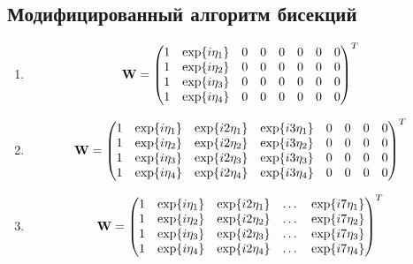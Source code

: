 \subsection{Модифицированный алгоритм бисекций}
\label{sec:Compressive:multipath}
\begin{enumerate}[label=\textbf{Шаг \arabic*:}]
    \item 
    \begin{equation}
        \vec W = 
        \begin{pmatrix}
            \mqty{
                1 & \exp{i\eta_1}\\
                1 & \exp{i\eta_2}\\
                1 & \exp{i\eta_3}\\
                1 & \exp{i\eta_4}\\
            }
            & \mqty{\zmat{4}{6}}
        \end{pmatrix}^T
    \end{equation}
    \item 
    \begin{equation}
        \vec W = 
        \begin{pmatrix}
            \mqty{
                1 & \exp{i\eta_1} & \exp{i2\eta_1} & \exp{i3\eta_1}\\
                1 & \exp{i\eta_2} & \exp{i2\eta_2} & \exp{i3\eta_2}\\
                1 & \exp{i\eta_3} & \exp{i2\eta_3} & \exp{i3\eta_3}\\
                1 & \exp{i\eta_4} & \exp{i2\eta_4} & \exp{i3\eta_4}\\
            }
            & \mqty{\zmat{4}{4}}
        \end{pmatrix}^T
    \end{equation}
    \item 
    \begin{equation}
        \vec W = 
        \begin{pmatrix}
            \mqty{
                1 & \exp{i\eta_1} & \exp{i2\eta_1} & \dots &\exp{i7\eta_1}\\
                1 & \exp{i\eta_2} & \exp{i2\eta_2} & \dots &\exp{i7\eta_2}\\
                1 & \exp{i\eta_3} & \exp{i2\eta_3} & \dots &\exp{i7\eta_3}\\
                1 & \exp{i\eta_4} & \exp{i2\eta_4} & \dots &\exp{i7\eta_4}\\
            }
        \end{pmatrix}^T
    \end{equation}

\end{enumerate}
